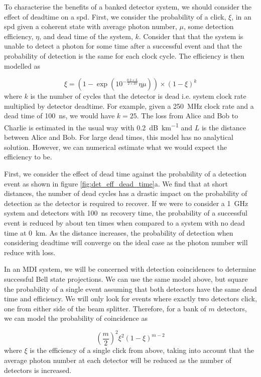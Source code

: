 To characterise the benefits of a banked detector system, we should consider the effect of deadtime on a \ac{spd}. First, we consider the probability of a click, $\xi$, in an \ac{spd} given a coherent state with average photon number, $\mu$, some detection efficiency, $\eta$, and dead time of the system, $k$. Consider that that the system is unable to detect a photon for some time after a successful event and that the probability of detection is the same for each clock cycle. The efficiency is then modelled as

\begin{equation}
	\xi = ( 1 - \exp(10^{-\frac{0.2 \times L}{2 \times 10}} \eta \mu) ) \times (1 - \xi)^k
\end{equation}
where $k$ is the number of cycles that the detector is dead i.e. system clock rate multiplied by detector deadtime. For example, given a \SI{250}{\MHz} clock rate and a dead time of \SI{100}{ns}, we would have $k=25$. The loss from Alice and Bob to Charlie is estimated in the usual way with \SI{0.2}{dB\per\km} and $L$ is the distance between Alice and Bob. For large dead times, this model has no analytical solution. However, we can numerical estimate what we would expect the efficiency to be.

First, we consider the effect of dead time against the probability of a detection event as shown in figure \ref{fig:det_eff_dead_time}a. We find that at short distances, the number of dead cycles has a drastic impact on the probability of detection as the detector is required to recover. If we were to consider a \SI{1}{GHz} system and detectors with \SI{100}{ns} recovery time, the probability of a successful event is reduced by about ten times when compared to a system with no dead time at \SI{0}{\km}. As the distance increases, the probability of detection when considering deadtime will converge on the ideal case as the photon number will reduce with loss. 

In an \ac{MDI} system, we will be concerned with detection coincidences to determine successful Bell state projections. We can use the same model above, but square the probability of a single event assuming that both detectors have the same dead time and efficiency. We will only look for events where exactly two detectors click, one from either side of the beam splitter. Therefore, for a bank of $m$ detectors, we can model the probability of coincidence as

\begin{equation}
	\left(\frac{m}{2}\right)^2 \xi^2 (1-\xi)^{m-2}
\end{equation}
where $\xi$ is the efficiency of a single click from above, taking into account that the average photon number at each detector will be reduced as the number of detectors is increased. 

